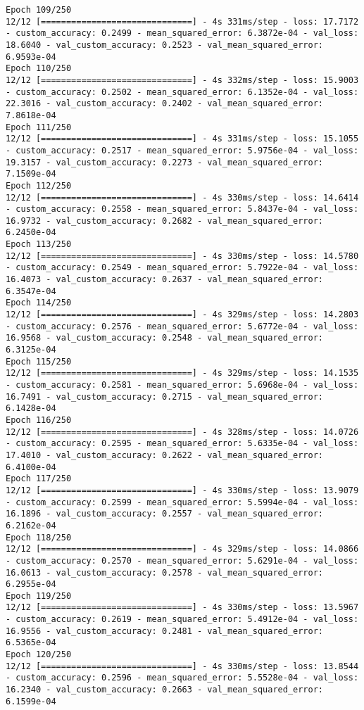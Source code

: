\begin{lstlisting}
Epoch 109/250
12/12 [==============================] - 4s 331ms/step - loss: 17.7172 - custom_accuracy: 0.2499 - mean_squared_error: 6.3872e-04 - val_loss: 18.6040 - val_custom_accuracy: 0.2523 - val_mean_squared_error: 6.9593e-04
Epoch 110/250
12/12 [==============================] - 4s 332ms/step - loss: 15.9003 - custom_accuracy: 0.2502 - mean_squared_error: 6.1352e-04 - val_loss: 22.3016 - val_custom_accuracy: 0.2402 - val_mean_squared_error: 7.8618e-04
Epoch 111/250
12/12 [==============================] - 4s 331ms/step - loss: 15.1055 - custom_accuracy: 0.2517 - mean_squared_error: 5.9756e-04 - val_loss: 19.3157 - val_custom_accuracy: 0.2273 - val_mean_squared_error: 7.1509e-04
Epoch 112/250
12/12 [==============================] - 4s 330ms/step - loss: 14.6414 - custom_accuracy: 0.2558 - mean_squared_error: 5.8437e-04 - val_loss: 16.9732 - val_custom_accuracy: 0.2682 - val_mean_squared_error: 6.2450e-04
Epoch 113/250
12/12 [==============================] - 4s 330ms/step - loss: 14.5780 - custom_accuracy: 0.2549 - mean_squared_error: 5.7922e-04 - val_loss: 16.4073 - val_custom_accuracy: 0.2637 - val_mean_squared_error: 6.3547e-04
Epoch 114/250
12/12 [==============================] - 4s 329ms/step - loss: 14.2803 - custom_accuracy: 0.2576 - mean_squared_error: 5.6772e-04 - val_loss: 16.9568 - val_custom_accuracy: 0.2548 - val_mean_squared_error: 6.3125e-04
Epoch 115/250
12/12 [==============================] - 4s 329ms/step - loss: 14.1535 - custom_accuracy: 0.2581 - mean_squared_error: 5.6968e-04 - val_loss: 16.7491 - val_custom_accuracy: 0.2715 - val_mean_squared_error: 6.1428e-04
Epoch 116/250
12/12 [==============================] - 4s 328ms/step - loss: 14.0726 - custom_accuracy: 0.2595 - mean_squared_error: 5.6335e-04 - val_loss: 17.4010 - val_custom_accuracy: 0.2622 - val_mean_squared_error: 6.4100e-04
Epoch 117/250
12/12 [==============================] - 4s 330ms/step - loss: 13.9079 - custom_accuracy: 0.2599 - mean_squared_error: 5.5994e-04 - val_loss: 16.1896 - val_custom_accuracy: 0.2557 - val_mean_squared_error: 6.2162e-04
Epoch 118/250
12/12 [==============================] - 4s 329ms/step - loss: 14.0866 - custom_accuracy: 0.2570 - mean_squared_error: 5.6291e-04 - val_loss: 16.0613 - val_custom_accuracy: 0.2578 - val_mean_squared_error: 6.2955e-04
Epoch 119/250
12/12 [==============================] - 4s 330ms/step - loss: 13.5967 - custom_accuracy: 0.2619 - mean_squared_error: 5.4912e-04 - val_loss: 16.9556 - val_custom_accuracy: 0.2481 - val_mean_squared_error: 6.5365e-04
Epoch 120/250
12/12 [==============================] - 4s 330ms/step - loss: 13.8544 - custom_accuracy: 0.2596 - mean_squared_error: 5.5528e-04 - val_loss: 16.2340 - val_custom_accuracy: 0.2663 - val_mean_squared_error: 6.1599e-04

\end{lstlisting}
